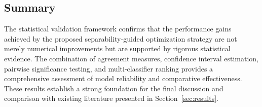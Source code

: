 \subsection{Summary}
\label{sec:stats_summary}

The statistical validation framework confirms that the performance gains achieved
by the proposed separability-guided optimization strategy are not merely
numerical improvements but are supported by rigorous statistical evidence. The
combination of agreement measures, confidence interval estimation, pairwise
significance testing, and multi-classifier ranking provides a comprehensive
assessment of model reliability and comparative effectiveness. These results
establish a strong foundation for the final discussion and comparison with
existing literature presented in Section~\ref{sec:results}.
